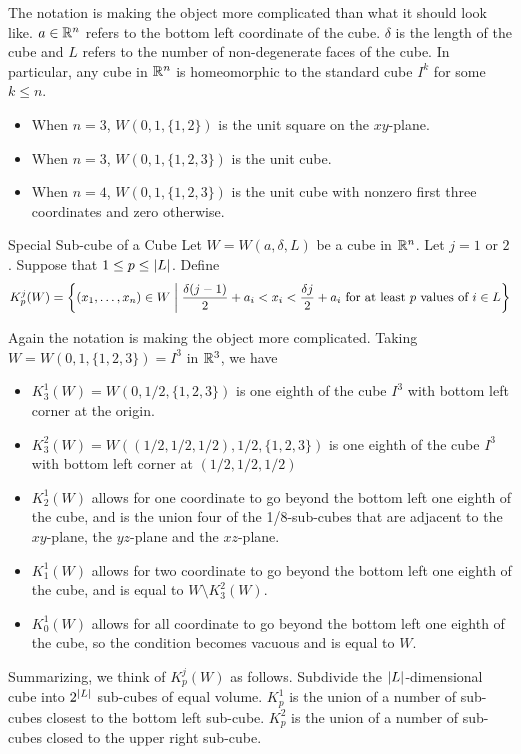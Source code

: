 \documentclass[a4paper]{article}
\begin{document}
The notation is making the object more complicated than what it should look like. $a\in\mathbb{R}^n$ refers to the bottom left coordinate of the cube. $\delta$ is the length of the cube and $L$ refers to the number of non-degenerate faces of the cube. In particular, any cube in $\mathbb{R}^n$ is homeomorphic to the standard cube $I^k$ for some $k\leq n$. 
\begin{itemize}
\item When $n=3$, $W(0,1,\{1,2\})$ is the unit square on the $xy$-plane. 
\item When $n=3$, $W(0,1,\{1,2,3\})$ is the unit cube. 
\item When $n=4$, $W(0,1,\{1,2,3\})$ is the unit cube with nonzero first three coordinates and zero otherwise. 
\end{itemize}

\begin{defn}{Special Sub-cube of a Cube}{} Let $W=W(a,\delta,L)$ be a cube in $\mathbb{R}^n$. Let $j=1$ or $2$. Suppose that $1\leq p\leq\abs{L}$. Define $$K_p^j(W)=\left\{(x_1,\dots,x_n)\in W\;\bigg{|}\;\frac{\delta(j-1)}{2}+a_i<x_i<\frac{\delta j}{2}+a_i\text{ for at least }p\text{ values of }i\in L\right\}$$
\end{defn}

Again the notation is making the object more complicated. Taking $W=W(0,1,\{1,2,3\})=I^3$ in $\mathbb{R}^3$, we have 
\begin{itemize}
\item $K_3^1(W)=W(0,1/2,\{1,2,3\})$ is one eighth of the cube $I^3$ with bottom left corner at the origin. 
\item $K_3^2(W)=W((1/2,1/2,1/2),1/2,\{1,2,3\})$ is one eighth of the cube $I^3$ with bottom left corner at $(1/2,1/2,1/2)$
\item $K_2^1(W)$ allows for one coordinate to go beyond the bottom left one eighth of the cube, and is the union four of the 1/8-sub-cubes that are adjacent to the $xy$-plane, the $yz$-plane and the $xz$-plane. 
\item $K_1^1(W)$ allows for two coordinate to go beyond the bottom left one eighth of the cube, and is equal to $W\setminus K_3^2(W)$. 
\item $K_0^1(W)$ allows for all coordinate to go beyond the bottom left one eighth of the cube, so the condition becomes vacuous and is equal to $W$. 
\end{itemize}

Summarizing, we think of $K_p^j(W)$ as follows. Subdivide the $\abs{L}$-dimensional cube into $2^\abs{L}$ sub-cubes of equal volume. $K_p^1$ is the union of a number of sub-cubes closest to the bottom left sub-cube. $K_p^2$ is the union of a number of sub-cubes closed to the upper right sub-cube. 
\end{document}
